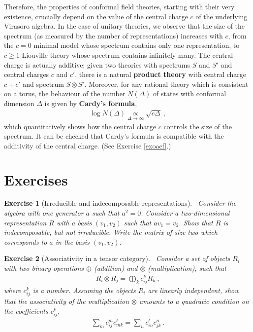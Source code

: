 \documentclass[12pt,a4paper,notitlepage]{report}
\numberwithin{equation}{section}
\newcommand{\term}[1]{\textbf{\boldmath #1}\index{#1}}
\theoremstyle{break}
\newtheorem{exo}{Exercise}[chapter]
\begin{document}
Therefore,
the properties of conformal field theories, starting with their very existence, crucially depend on the value of the central charge $c$ of the underlying Virasoro algebra.
In the case of unitary theories, we observe that the size of the spectrum (as measured by the number of representations) increases with $c$, from the $c=0$ minimal model whose spectrum contains only one representation, to $c\geq 1$ Liouville theory whose spectrum contains infinitely many.
The central charge is actually additive: given two theories with spectrums $S$ and $S'$ and central charges $c$ and $c'$, there is a natural \term{product theory} with central charge $c+c'$ and spectrum $S\otimes S'$.
Moreover, for any rational theory which is consistent on a torus, 
the behaviour of the number $N(\Delta)$ of states with conformal dimension $\Delta$ is given by \term{Cardy's formula},
\begin{align}
 \log N(\Delta) \underset{\Delta\rightarrow \infty}{\propto} \sqrt{c \Delta} \ ,
\label{nds}
\end{align}
which quantitatively shows how the central charge $c$ controls the size of the spectrum.
It can be checked that Cardy's formula is compatible with the additivity of the central charge. (See Exercise \ref{exoacf}.)

\section{Exercises}


\begin{exo}[Irreducible and indecomposable representations] 
~\label{exoirr}
Consider the algebra with one generator $a$ such that $a^2 = 0$.
Consider a two-dimensional representation $R$ with a basis $(v_1,v_2)$ such that $av_1=v_2$.
Show that $R$ is indecomposable, but not irreducible.
Write the matrix of size two which corresponds to $a$ in the basis $(v_1,v_2)$. 
\end{exo}

\begin{exo}[Associativity in a tensor category]
 ~\label{exoten}
Consider a set of objects $R_i$ with two binary operations $\oplus$ (addition) and $\otimes$ (multiplication), such that 
\begin{align}
 R_i \otimes R_j = \bigoplus_k c_{ij}^k R_k\ ,
\end{align}
where $c_{ij}^k$ is a number.
Assuming the objects $R_i$ are linearly independent, show that the associativity of the multiplication $\otimes$ amounts to a quadratic condition on the coefficients $c_{ij}^k$,
\begin{align}
 \sum_m c_{ij}^m c_{mk}^\ell = \sum_n c_{in}^\ell c_{jk}^n\ .
\end{align}
\end{exo}
\end{document}
